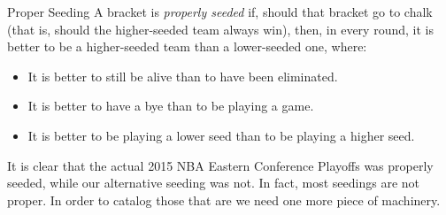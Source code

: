 {\begin{definition}{Proper Seeding}{}
    A bracket is \textit{properly seeded} if, should that bracket go to chalk (that is, should the higher-seeded team always win), then, in every round, it is better to be a higher-seeded team than a lower-seeded one, where: \begin{itemize}
        \item It is better to still be alive than to have been eliminated.
        \item It is better to have a bye than to be playing a game.
        \item It is better to be playing a lower seed than to be playing a higher seed.
    \end{itemize}
\end{definition}
It is clear that the actual 2015 NBA Eastern Conference Playoffs was properly seeded, while our alternative seeding was not. In fact, most seedings are not proper. In order to catalog those that are we need one more piece of machinery.

}